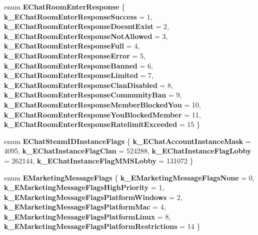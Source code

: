 \begin{DoxyCompactItemize}
\mbox{\label{namespace_valve_1_1_steamworks_ad7ba016b077bdd46597dadc5100ed588}} 
enum {\bfseries E\+Chat\+Room\+Enter\+Response} \{ \newline
{\bfseries k\+\_\+\+E\+Chat\+Room\+Enter\+Response\+Success} = 1, 
{\bfseries k\+\_\+\+E\+Chat\+Room\+Enter\+Response\+Doesnt\+Exist} = 2, 
{\bfseries k\+\_\+\+E\+Chat\+Room\+Enter\+Response\+Not\+Allowed} = 3, 
{\bfseries k\+\_\+\+E\+Chat\+Room\+Enter\+Response\+Full} = 4, 
\newline
{\bfseries k\+\_\+\+E\+Chat\+Room\+Enter\+Response\+Error} = 5, 
{\bfseries k\+\_\+\+E\+Chat\+Room\+Enter\+Response\+Banned} = 6, 
{\bfseries k\+\_\+\+E\+Chat\+Room\+Enter\+Response\+Limited} = 7, 
{\bfseries k\+\_\+\+E\+Chat\+Room\+Enter\+Response\+Clan\+Disabled} = 8, 
\newline
{\bfseries k\+\_\+\+E\+Chat\+Room\+Enter\+Response\+Community\+Ban} = 9, 
{\bfseries k\+\_\+\+E\+Chat\+Room\+Enter\+Response\+Member\+Blocked\+You} = 10, 
{\bfseries k\+\_\+\+E\+Chat\+Room\+Enter\+Response\+You\+Blocked\+Member} = 11, 
{\bfseries k\+\_\+\+E\+Chat\+Room\+Enter\+Response\+Ratelimit\+Exceeded} = 15
 \}
\item 
\mbox{\label{namespace_valve_1_1_steamworks_a49b252dd7c672f37627b509de17bffff}} 
enum {\bfseries E\+Chat\+Steam\+I\+D\+Instance\+Flags} \{ {\bfseries k\+\_\+\+E\+Chat\+Account\+Instance\+Mask} = 4095, 
{\bfseries k\+\_\+\+E\+Chat\+Instance\+Flag\+Clan} = 524288, 
{\bfseries k\+\_\+\+E\+Chat\+Instance\+Flag\+Lobby} = 262144, 
{\bfseries k\+\_\+\+E\+Chat\+Instance\+Flag\+M\+M\+S\+Lobby} = 131072
 \}
\item 
\mbox{\label{namespace_valve_1_1_steamworks_a5b1c56d4409b20a9175d4923283f4940}} 
enum {\bfseries E\+Marketing\+Message\+Flags} \{ \newline
{\bfseries k\+\_\+\+E\+Marketing\+Message\+Flags\+None} = 0, 
{\bfseries k\+\_\+\+E\+Marketing\+Message\+Flags\+High\+Priority} = 1, 
{\bfseries k\+\_\+\+E\+Marketing\+Message\+Flags\+Platform\+Windows} = 2, 
{\bfseries k\+\_\+\+E\+Marketing\+Message\+Flags\+Platform\+Mac} = 4, 
\newline
{\bfseries k\+\_\+\+E\+Marketing\+Message\+Flags\+Platform\+Linux} = 8, 
{\bfseries k\+\_\+\+E\+Marketing\+Message\+Flags\+Platform\+Restrictions} = 14
 \}
\item 
\mbox{\label{namespace_valve_1_1_steamworks_a58cd292bad1160d42a70198c4d8251f3}} 

\end{DoxyCompactItemize}
